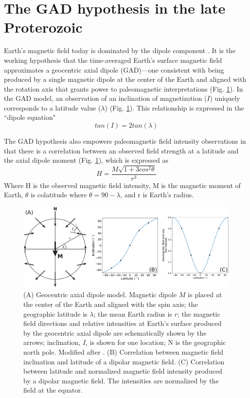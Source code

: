 \section*{The GAD hypothesis in the late Proterozoic}

Earth's magnetic field today is dominated by the dipole component \citep{Alken2021a}. It is the working hypothesis that the time-averaged Earth's surface magnetic field approximates a geocentric axial dipole (GAD)---one consistent with being produced by a single magnetic dipole at the center of the Earth and aligned with the rotation axis that grants power to paleomagnetic interpretations (Fig. \ref{fig:GAD}). In the GAD model, an observation of an inclination of magnetization ($I$) uniquely corresponds to a latitude value ($\lambda$) (Fig. \ref{fig:GAD}). This relationship is expressed in the ``dipole equation" 
\begin{equation*}
    tan(I) = 2 tan(\lambda)
\label{direction_eq}
\end{equation*} 

The GAD hypothesis also empowers paleomagnetic field intensity observations in that there is a correlation between an observed field strength at a latitude and the axial dipole moment (Fig. \ref{fig:GAD}), which is expressed as 
\begin{equation*}
    H = \frac{M\sqrt{1+3cos^2\theta}}{r^3}
\label{intensity_eq}
\end{equation*} Where H is the observed magnetic field intensity, M is the magnetic moment of Earth, $\theta$ is colatitude where $\theta=90-\lambda$, and r is Earth's radius. 

\begin{figure}[h!]
    \centering
    \includegraphics[width=\textwidth]{figure/GAD.pdf}
    \caption[The GAD hypothesis]{(A) Geocentric axial dipole model. Magnetic dipole $M$ is placed at the center of the Earth and aligned with the spin axis; the geographic latitude is $\lambda$; the mean Earth radius is $r$; the magnetic field directions and relative intensities at Earth’s surface produced by the geocentric axial dipole are schematically shown by the arrows; inclination, $I$, is shown for one location; N is the geographic north pole. Modified after \cite{McElhinny1973a}. (B) Correlation between magnetic field inclination and latitude of a dipolar magnetic field. (C) Correlation between latitude and normalized magnetic field intensity produced by a dipolar magnetic field. The intensities are normalized by the field at the equator. }
    \label{fig:GAD}
\end{figure}


